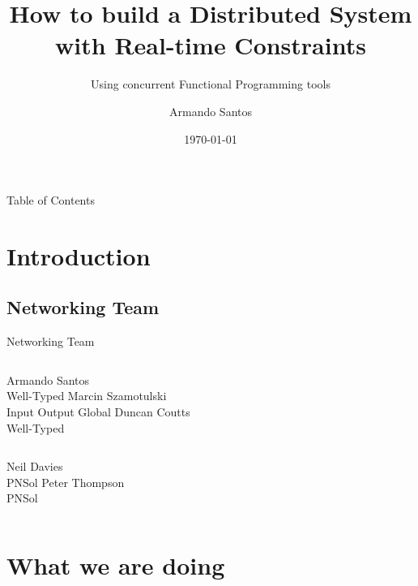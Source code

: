 \documentclass{beamer}
\begin{document}
\title{How to build a Distributed System with Real-time Constraints}
\subtitle{Using concurrent Functional Programming tools}
\author{Armando Santos}
\date{\today}
\maketitle


\begin{frame}{Table of Contents}
  \tableofcontents
\end{frame}

\section{Introduction}
\subsection*{Networking Team}
\begin{frame}{Networking Team}
  \begin{columns}
    \centering
    Armando Santos \\ Well-Typed
    \centering
    Marcin Szamotulski \\ Input Output Global
    \centering
    Duncan Coutts \\ Well-Typed
  \end{columns}
  \vskip1cm
  \begin{columns}
    \centering
    Neil Davies \\ PNSol
    \centering
    Peter Thompson \\ PNSol
  \end{columns}
\end{frame}

\section{What we are doing}
\end{document}
